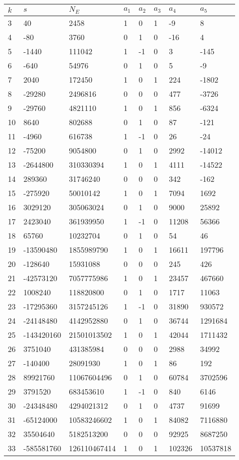 \documentclass{amsart}
\begin{document}
\begin{longtable}{|l|l|l|lllll|}
\hline
$k$ & $s$ & $N_E$ & $a_1$ & $a_2$ & $a_3$ & $a_4$ & $a_5$\\
\hline
3&40&2458&1&0&1&-9&8\\
4&-80&3760&0&1&0&-16&4\\
5&-1440&111042&1&-1&0&3&-145\\
6&-640&54976&0&1&0&5&-9\\
7&2040&172450&1&0&1&224&-1802\\
8&-29280&2496816&0&0&0&477&-3726\\
9&-29760&4821110&1&0&1&856&-6324\\
10&8640&802688&0&1&0&87&-121\\
11&-4960&616738&1&-1&0&26&-24\\
12&-75200&9054800&0&1&0&2992&-14012\\
13&-2644800&310330394&1&0&1&4111&-14522\\
14&289360&31746240&0&0&0&342&-162\\
15&-275920&50010142&1&0&1&7094&1692\\
16&3029120&305063024&0&1&0&9000&25892\\
17&2423040&361939950&1&-1&0&11208&56366\\
18&65760&10232704&0&1&0&54&46\\
19&-13590480&1855989790&1&0&1&16611&197796\\
20&-128640&15931088&0&0&0&245&426\\
21&-42573120&7057775986&1&0&1&23457&467660\\
22&1008240&118820800&0&1&0&1717&11063\\
23&-17295360&3157245126&1&-1&0&31890&930572\\
24&-24148480&4142952880&0&1&0&36744&1291684\\
25&-143420160&21501013502&1&0&1&42044&1711432\\
26&3751040&431385984&0&0&0&2988&34992\\
27&-140400&28091930&1&0&1&86&192\\
28&89921760&11067604496&0&1&0&60784&3702596\\
29&3791520&683453610&1&-1&0&840&6146\\
30&-24348480&4294021312&0&1&0&4737&91699\\
31&-65124000&10583246602&1&0&1&84082&7116880\\
32&35504640&5182513200&0&0&0&92925&8687250\\
33&-585581760&126110467414&1&0&1&102326&10537818\\

\end{longtable}
\end{document}
